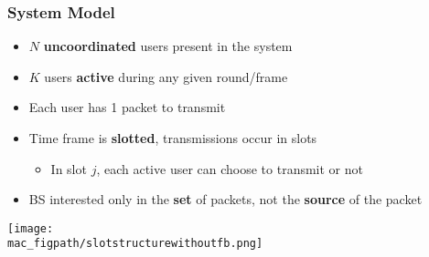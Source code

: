 \begin{frame}
\frametitle{System Model}

\begin{itemize}
  \item $N$ \textbf{uncoordinated} users present in the system
  \item $K$ users \textbf{active} during any given round/frame
  \item Each user has 1 packet to transmit
  \item Time frame is \textbf{slotted}, transmissions occur in slots
   \begin{itemize}
	   \item In slot $j$, each active user can choose to transmit or not
	\end{itemize}
   \item<2-> BS interested only in the \textbf{set} of packets, not the \textbf{source} of the packet
   
\end{itemize}
\vspace{10ex}
\centering 
\texttt{[image: \\mac\_figpath/slotstructurewithoutfb.png]}
%  
\end{frame}

